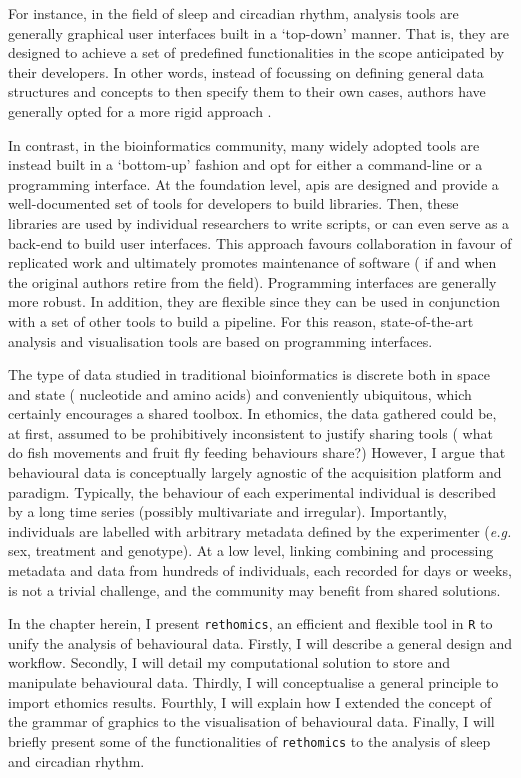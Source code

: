 For instance, in the field of sleep and circadian rhythm, analysis tools are generally graphical user interfaces built in a `top-down' manner.
That is, they are designed to achieve a set of predefined functionalities in the scope anticipated by their developers.
In other words, instead of focussing on defining general data structures and concepts to then specify them to their own cases, authors have generally opted for a more rigid approach \cite{gilestro_pysolo_2009,schmid_new_2011,cichewicz_shinyr-dam_2018}.

In contrast, in the  bioinformatics community, many widely adopted tools are instead built in a `bottom-up' fashion and opt for either a command-line or a programming interface.
At the foundation level, \glspl{api} are designed and provide a well-documented set of tools for developers to build libraries.
Then, these libraries are used by individual researchers to write scripts, or can even serve as a back-end to build user interfaces.
This approach favours collaboration in favour of replicated work and ultimately promotes maintenance of software (\eg{} if and when the original authors retire from the field). 
Programming interfaces are generally more robust.
In addition, they are flexible since they can be used in conjunction with a set of other tools to build a pipeline.
For this reason, state-of-the-art analysis and visualisation tools are based on programming interfaces\cite{wickham_ggplot2_2016}.

The type of data studied in traditional bioinformatics is discrete both in space and state (\ie{} nucleotide and amino acids) and conveniently ubiquitous, which certainly encourages a shared toolbox. 
In ethomics, the data gathered could be, at first, assumed to be prohibitively inconsistent to justify sharing tools (\eg{} what do fish movements and fruit fly feeding behaviours share?)
However, I argue that behavioural data is conceptually largely agnostic of the acquisition platform and paradigm. 	
Typically, the behaviour of each experimental individual is described by a long time series (possibly multivariate and irregular).
Importantly, individuals are labelled with arbitrary metadata defined by the experimenter (\emph{e.g.} sex, treatment and genotype).
At a low level, linking combining and processing metadata and data from hundreds of individuals, each recorded for days or weeks, is not a trivial challenge, and the community may benefit from shared solutions.

In the chapter herein, I present \texttt{rethomics}, an efficient and flexible tool in \texttt{R} to unify the analysis of behavioural data.
Firstly, I will describe a general design and workflow.
Secondly, I will detail my computational solution to store and manipulate behavioural data.
Thirdly, I will conceptualise a general principle to import ethomics results.
Fourthly, I will explain how I extended the concept of the grammar of graphics\cite{wilkinson_grammar_2005,wickham_ggplot2_2016} to the visualisation of behavioural data.
Finally, I will briefly present some of the functionalities of \texttt{rethomics} to the analysis of sleep and circadian rhythm.

